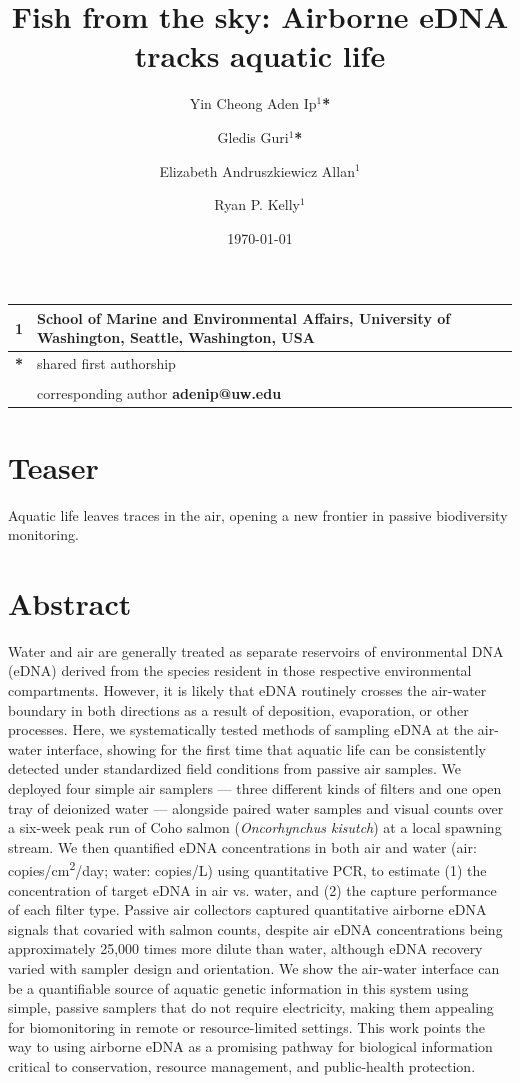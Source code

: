 \documentclass{article}
\title{Fish from the sky: Airborne eDNA tracks aquatic life}
\author{Yin Cheong Aden Ip$^1$\textbf{*} \and
Gledis Guri$^1$\textbf{*} \and
Elizabeth Andruszkiewicz Allan$^1$ \and
Ryan P. Kelly$^1$}
\date{\today}
\begin{document}
\maketitle

\section*{}

\begin{center}
\begin{tabular}{ll}
1 & School of Marine and Environmental Affairs, University of Washington, Seattle, Washington, USA \\
\hline
\textbf{*} & shared first authorship\\
&\\
& corresponding author \textbf{adenip@uw.edu}
\end{tabular}
\end{center}

\section*{Teaser}
Aquatic life leaves traces in the air, opening a new frontier in passive biodiversity monitoring.

\section*{Abstract}
Water and air are generally treated as separate reservoirs of environmental DNA (eDNA) derived from the species resident in those respective environmental compartments. However, it is likely that eDNA routinely crosses the air-water boundary in both directions as a result of deposition, evaporation, or other processes. Here, we systematically tested methods of sampling eDNA at the air-water interface, showing for the first time that aquatic life can be consistently detected under standardized field conditions from passive air samples. We deployed four simple air samplers — three different kinds of filters and one open tray of deionized water — alongside paired water samples and visual counts over a six-week peak run of Coho salmon (\textit{Oncorhynchus kisutch}) at a local spawning stream. We then quantified eDNA concentrations in both air and water (air: copies/cm\textsuperscript{2}/day; water: copies/L) using quantitative PCR, to estimate (1) the concentration of target eDNA in air vs. water, and (2) the capture performance of each filter type. Passive air collectors captured quantitative airborne eDNA signals that covaried with salmon counts, despite air eDNA concentrations being approximately 25,000 times more dilute than water, although eDNA recovery varied with sampler design and orientation. We show the air-water interface can be a quantifiable source of aquatic genetic information in this system using simple, passive samplers that do not require electricity, making them appealing for biomonitoring in remote or resource-limited settings. This work points the way to using airborne eDNA as a promising pathway for biological information critical to conservation, resource management, and public-health protection.
\end{document}
